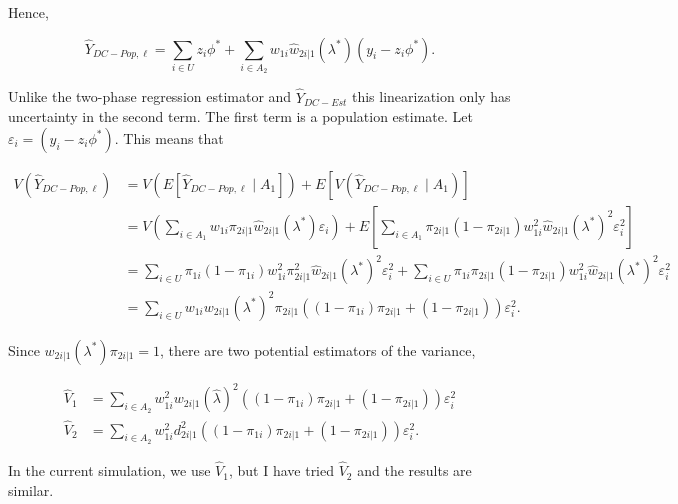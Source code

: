 \documentclass[12pt]{article}
\begin{document}
Hence,

$$
\hat Y_{DC-Pop, \ell} = \sum_{i \in U} z_i \phi^* + \sum_{i \in A_2} w_{1i} \hat
w_{2i|1}(\lambda^*) (y_i - z_i \phi^*).
$$

Unlike the two-phase regression estimator and $\hat Y_{DC-Est}$ this
linearization only has uncertainty in the second term. The first term is a
population estimate. Let $\varepsilon_i = (y_i - z_i \phi^*)$. This means that

\begin{align*}
  V(\hat Y_{DC-Pop, \ell}) 
  &= V(E[\hat Y_{DC-Pop, \ell} \mid A_1]) + E[V(\hat Y_{DC-Pop, \ell} \mid A_1)] \\
  &= V\left(\sum_{i \in A_1} w_{1i} \pi_{2i|1} \hat w_{2i|1}(\lambda^*)
  \varepsilon_i\right) + 
  E\left[\sum_{i \in A_1} \pi_{2i|1}(1 - \pi_{2i|1}) w_{1i}^2 \hat w_{2i|1}(\lambda^*)^2
    \varepsilon_i^2 \right]\\
  &= \sum_{i \in U} \pi_{1i}(1 - \pi_{1i}) w_{1i}^2 \pi_{2i|1}^2 
  \hat w_{2i|1}(\lambda^*)^2 \varepsilon_i^2 +
  \sum_{i \in U} \pi_{1i}\pi_{2i|1}(1 - \pi_{2i|1}) w_{1i}^2 \hat w_{2i|1}(\lambda^*)^2
    \varepsilon_i^2\\
  &= \sum_{i \in U} w_{1i} w_{2i|1}(\lambda^*)^2 \pi_{2i|1}
  ((1 - \pi_{1i})\pi_{2i|1} + (1 - \pi_{2i|1})) \varepsilon_i^2.
\end{align*}

Since $w_{2i|1}(\lambda^*) \pi_{2i|1} = 1$, there are two potential estimators
of the variance,

\begin{align*}
  \hat V_1 &= \sum_{i \in A_2} w_{1i}^2 w_{2i|1}(\hat \lambda)^2 
  ((1 - \pi_{1i})\pi_{2i|1} + (1 - \pi_{2i|1})) \varepsilon_i^2\\
  \hat V_2 &= \sum_{i \in A_2}  w_{1i}^2 d_{2i|1}^2
  ((1 - \pi_{1i})\pi_{2i|1} + (1 - \pi_{2i|1})) \varepsilon_i^2.
\end{align*}

In the current simulation, we use $\hat V_1$, but I have tried $\hat V_2$ and
the results are similar.
\end{document}

